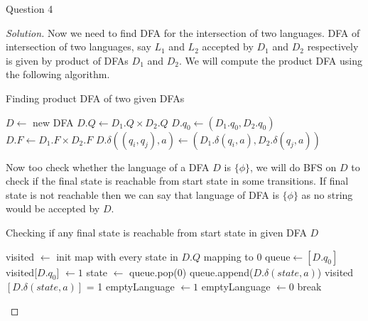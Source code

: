 \begin{solution}{Question 4}
\begin{proof}[Solution]
        Now we need to find DFA for the intersection of two languages. DFA of intersection of two languages, say $L_1$ and $L_2$ accepted by $D_1$ and $D_2$ respectively is given by product of DFAs $D_1$ and $D_2$. We will compute the product DFA using the following algorithm.
        
        \begin{algorithm}[H]
            \caption{Finding product DFA of two given DFAs}
            \begin{algorithmic}[1]
                    \State $D \gets$ new DFA
                    \State $D.Q \gets D_1.Q \times D_2.Q$
                    \State $D.q_0 \gets (D_1.q_0, D_2.q_0)$
                    \State $D.F \gets D_1.F \times D_2.F$
                            \State $D.\delta((q_i, q_j), a) \gets (D_1.\delta(q_i, a), D_2.\delta(q_j, a))$
                        \EndFor{}
                    \EndFor{}
                \EndProcedure{}
            \end{algorithmic}
        \end{algorithm}
        
        Now too check whether the language of a DFA $D$ is $\{\phi\}$, we will do BFS on $D$ to check if the final state is reachable from start state in some transitions. If final state is not reachable then we can say that language of DFA is $\{\phi\}$ as no string would be accepted by $D$.
        
        \begin{algorithm}[H]
            \caption{Checking if any final state is reachable from start state in given DFA $D$}
            \begin{algorithmic}[1]
                    \State visited $\gets$ init map with every state in $D.Q$ mapping to $0$
                    \State queue$\gets [D.q_0]$
                    \State visited[$D.q_0$] $\gets 1$
                    \State
                        \State state $\gets$ queue.pop(0)
                                \State queue.append($D.\delta(state, a)$)
                                \State visited$[D.\delta(state, a)]$ = 1
                            \EndIf{}
                        \EndFor{}
                    \EndWhile
                    \State
                    \State emptyLanguage $\gets 1$
                            \State emptyLanguage $\gets 0$
                            \State break
                        \EndIf{}
                    \EndFor{}
                    \State 
                \EndProcedure{}
            \end{algorithmic}
        \end{algorithm}
        

\end{proof}
\end{solution}
